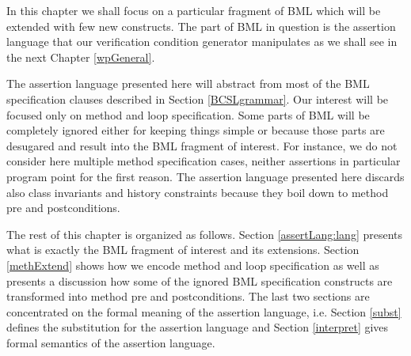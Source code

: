 In this chapter we shall focus on 
 a particular fragment of BML which will be extended with 
few new constructs.  The part of BML in question  
is the assertion language that our  verification condition generator manipulates
 as we shall see in the next Chapter \ref{wpGeneral}.



The assertion language presented here will abstract from most of the BML specification clauses described in Section \ref{BCSLgrammar}.
Our interest will be focused only on method and loop specification.
Some parts of BML will be completely ignored  either for keeping things simple or because those parts
are desugared and result into the BML fragment of interest. For instance, 
we do not consider here multiple method specification cases, neither assertions in particular program 
point for the first reason. The assertion language presented here discards also class invariants and
 history constraints because  they boil down to method pre and postconditions.

The rest of this chapter is organized as follows. Section \ref{assertLang:lang} presents
what is exactly the BML fragment of interest and its extensions.
Section \ref{methExtend} shows how we encode method and loop specification as well as presents a discussion
how some of the ignored BML specification constructs are transformed into method pre and postconditions.
The last two sections are concentrated on the formal meaning of the assertion language, i.e.
Section \ref{subst} defines the substitution for the assertion language and 
 Section \ref{interpret} gives formal semantics of the assertion language.


